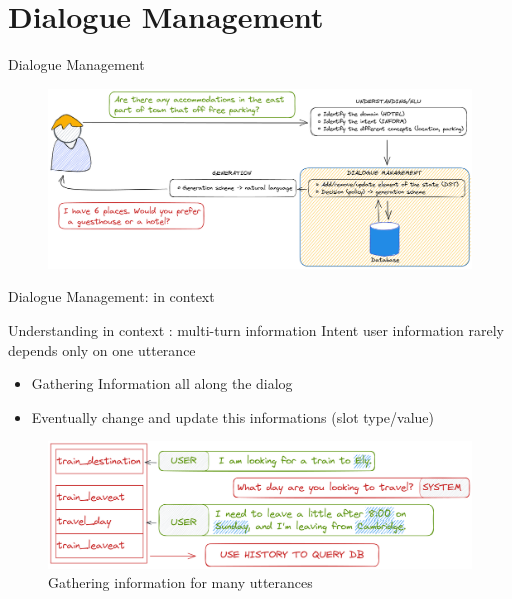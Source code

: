 \documentclass[10pt,aspectratio=169]{beamer}
\begin{document}
\section{Dialogue Management}
\begin{frame}{Dialogue Management}
    \begin{figure}
        \centering
        \includegraphics[width=1.\textwidth]{media/dialogue_task_complete_dm.png}
    \end{figure}
\end{frame}
\begin{frame}{Dialogue Management: in context}
    \begin{block}{Understanding in context : multi-turn information}
        Intent user information rarely depends only on one utterance
        \begin{itemize}
            \item Gathering Information all along the dialog
            \item Eventually change and update this informations (slot type/value)
        \end{itemize}
    \end{block}
    \begin{figure}[b]
        \centering
        \includegraphics[width=.8\textwidth]{media/in_context_history.png}
        \caption{Gathering information for many utterances}
        \label{fig:my_label}
    \end{figure}
    
\end{frame}
\end{document}
